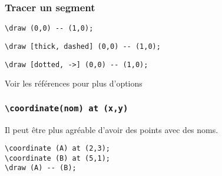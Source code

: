 \documentclass{clic_latex_beamer}
\begin{document}
\begin{frame}[fragile]
\frametitle{Tracer un segment}


\begin{lstlisting}
\draw (0,0) -- (1,0);
\end{lstlisting}

\pause


\begin{lstlisting}
\draw [thick, dashed] (0,0) -- (1,0);
\end{lstlisting}


\begin{lstlisting}
\draw [dotted, ->] (0,0) -- (1,0);
\end{lstlisting}

Voir les références pour plus d'options

\end{frame}

\begin{frame}[fragile]
\frametitle{\texttt{\textbackslash coordinate(nom) at (x,y)}}
Il peut être plus agréable d'avoir des points avec des noms.

\begin{lstlisting}
\coordinate (A) at (2,3);
\coordinate (B) at (5,1);
\draw (A) -- (B);
\end{lstlisting}

\pause



\end{frame}
\end{document}
